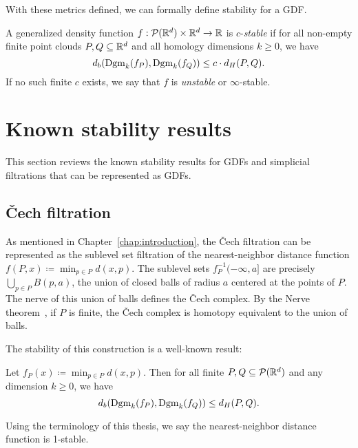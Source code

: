 With these metrics defined, we can formally define stability for a GDF.
\begin{definition}
    A generalized density function $f : \mathcal{P}(\mathbb{R}^d) \times \mathbb{R}^d \to \mathbb{R}$ is
    $c$-\emph{stable} if for all non-empty finite point clouds $P, Q \subseteq
    \mathbb{R}^d$ and all homology dimensions $k \geq 0$, we have
    \begin{equation}
        d_b(\operatorname{Dgm}_k(f_P), \operatorname{Dgm}_k(f_Q)) \leq c \cdot d_H(P, Q).
    \end{equation}
    If no such finite $c$ exists, we say that $f$ is \emph{unstable} or
    $\infty$-stable.
\end{definition}

\section{Known stability results}

This section reviews the known stability results for GDFs and simplicial
filtrations that can be represented as GDFs.

\subsection{\v{C}ech filtration}
As mentioned in Chapter~\ref{chap:introduction}, the \v{C}ech filtration can be
represented as the sublevel set filtration of the nearest-neighbor distance
function $f(P, x) \coloneqq \min_{p\in P} d(x, p)$.
The sublevel sets $f_P^{-1}(-\infty, a]$ are precisely
$\bigcup_{p\in P} B(p, a)$, the union of closed balls of radius $a$ centered at
the points of $P$. The nerve of this union of balls defines the \v{C}ech
complex. By the Nerve theorem~\cite{Borsuk1948,leray1945forme}, if $P$ is finite,
the \v{C}ech complex is homotopy equivalent to the union of balls.

The stability of this construction is a well-known result:
\begin{theorem}
    Let $f_P(x) \coloneqq \min_{p\in P} d(x, p)$. Then for all finite
    $P, Q \subseteq \mathcal{P}(\mathbb{R}^d)$ and any dimension $k \geq 0$, we have
    \begin{equation}
        d_b(\operatorname{Dgm}_k(f_P), \operatorname{Dgm}_k(f_Q)) \leq d_H(P, Q).
    \end{equation}
\end{theorem}
Using the terminology of this thesis, we say the nearest-neighbor distance
function is 1-stable.

